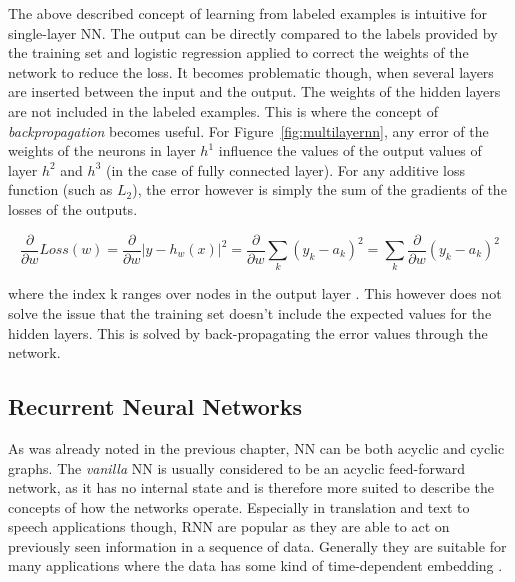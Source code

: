 
The above described concept of learning from labeled examples is intuitive for single-layer \ac{NN}. The output can be
directly compared to the labels provided by the training set and logistic regression applied to correct the weights of
the network to reduce the loss. It becomes problematic though, when several layers are inserted between the input and
the output. The weights of the hidden layers are not included in the labeled examples. This is where the concept of
\emph{backpropagation} becomes useful. For Figure~\ref{fig:multilayernn}, any error of the weights of the neurons in
layer $h^1$ influence the values of the output values of layer $h^2$ and $h^3$ (in the case of fully connected layer).
For any additive loss function (such as $L_2$), the error however is simply the sum of the gradients of the losses of
the outputs\cite[p.733f.]{russell2016artificial}.

\begin{equation}
    \frac{\partial}{\partial w} Loss(w) =  \frac{\partial}{\partial w} \vert y-h_w(x) \vert ^2 = \frac{\partial}{\partial w} \sum_k{(y_k - a_k)^2} =  \sum_k{\frac{\partial}{\partial w}(y_k - a_k)^2}
    \label{equ:errorssum}
\end{equation}

where the index k ranges over nodes in the output layer \cite[p.733f.]{russell2016artificial}. This however does not
solve the issue that the training set doesn't include the expected values for the hidden layers. This is solved by
back-propagating the error values through the network. %


\subsection{Recurrent Neural Networks}%
\label{sec:recurrent_neural_networks}

As was already noted in the previous chapter, \ac{NN} can be both acyclic and cyclic graphs. The
\emph{vanilla} \ac{NN} is usually considered to be an acyclic feed-forward network, as it has no internal state and is
therefore more suited to describe the concepts of how the networks operate. Especially in translation and text to speech
applications though, \ac{RNN} are popular as they are able to act on previously seen information in a sequence of
data. Generally they are suitable for many applications where the data has some kind of time-dependent embedding
\cite[p.373]{Goodfellow-et-al-2016}.

